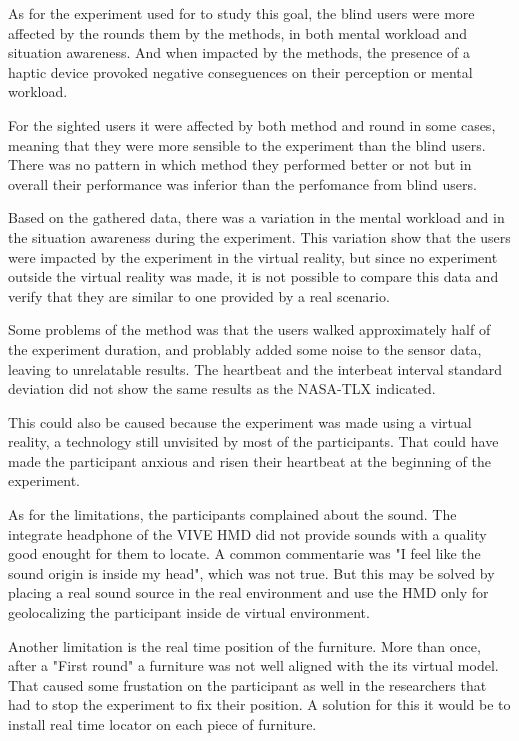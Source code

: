 As for the experiment used for to study this goal, the blind users were more affected by the rounds them by the methods, in both mental workload and situation awareness. And when impacted by the methods, the presence of a haptic device provoked negative conseguences on their perception or mental workload.

For the sighted users it were affected by both method and round in some cases, meaning that they were more sensible to the experiment than the blind users. There was no pattern in which method they performed better or not but in overall their performance was inferior than the perfomance from blind users.
    
Based on the gathered data, there was a variation in the mental workload and in the situation awareness during the experiment. This variation show that the users were impacted by the experiment in the virtual reality, but since no experiment outside the virtual reality was made, it is not possible to compare this data and verify that they are similar to one provided by a real scenario.

Some problems of the method was that the users walked approximately half of the experiment duration, and problably added some noise to the sensor data, leaving to unrelatable results. The heartbeat and the interbeat interval standard deviation did not show the same results as the NASA-TLX indicated. 

This could also be caused because the experiment was made using a virtual reality, a technology still unvisited by most of the participants. That could have made the participant anxious and risen their heartbeat at the beginning of the experiment.

As for the limitations, the participants complained about the sound. The integrate headphone of the VIVE HMD did not provide sounds with a quality good enought for them to locate. A common commentarie was "I feel like the sound origin is inside my head", which was not true. But this may be solved by placing a real sound source in the real environment and use the HMD only for geolocalizing the participant inside de virtual environment.

Another limitation is the real time position of the furniture. More than once, after a "First round" a furniture was not well aligned with the its virtual model. That caused some frustation on the participant as well in the researchers that had to stop the experiment to fix their position. A solution for this it would be to install real time locator on each piece of furniture.

